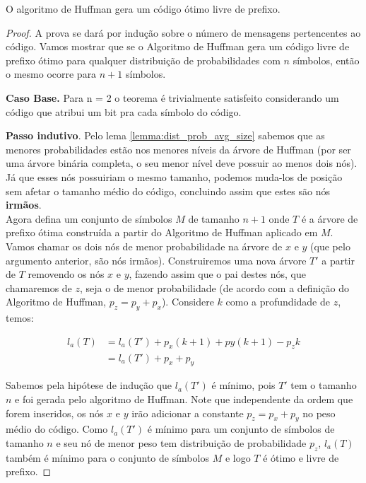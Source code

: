 \begin{theorem} O algoritmo de Huffman gera um código ótimo livre de prefixo.
\begin{proof}
A prova se dará por indução sobre o número de mensagens pertencentes ao código. 
Vamos mostrar que se o Algoritmo de Huffman gera um código livre de prefixo ótimo para qualquer distribuição de probabilidades com $n$ símbolos, então o mesmo ocorre para $n + 1$ símbolos.

\item \textbf{Caso Base.} Para n = 2 o teorema é trivialmente satisfeito considerando um código que atribui um bit pra cada símbolo do código.

\item \textbf{Passo indutivo}. Pelo lema \ref{lemma:dist_prob_avg_size} sabemos que as menores probabilidades estão nos menores níveis da árvore de Huffman (por ser uma árvore binária completa, o seu menor nível deve possuir ao menos dois nós). 
Já que esses nós possuiriam o mesmo tamanho, podemos muda-los de posição sem afetar o tamanho médio do código, concluindo assim que estes são nós \textbf{irmãos}.\\
Agora defina um conjunto de símbolos $M$ de tamanho $n + 1$ onde $T$ é a árvore de prefixo ótima construída a partir do Algoritmo de Huffman aplicado em $M$.
Vamos chamar os dois nós de menor probabilidade na árvore de $x$ e $y$ (que pelo argumento anterior, são nós irmãos). 
Construiremos uma nova árvore $T'$ a partir de $T$ removendo os nós $x$ e $y$, fazendo assim que o pai destes nós, que chamaremos de $z$, seja o de menor probabilidade (de acordo com a definição do Algoritmo de Huffman, $p_z = p_y + p_x$).
 Considere $k$ como a profundidade de $z$, temos:

\begin{align*}
l_a(T) &= l_a(T') + p_x(k + 1) + py(k + 1) - p_z k \\
&= l_a(T') + p_x + p_y
\end{align*}

Sabemos pela hipótese de indução que $l_a(T')$ é mínimo, pois $T'$ tem o tamanho $n$ e foi gerada pelo algoritmo de Huffman. 
Note que independente da ordem que forem inseridos, os nós $x$ e $y$ irão adicionar a constante $p_z = p_x + p_y$ no peso médio do código. 
Como $l_a(T')$ é mínimo para um conjunto de símbolos de tamanho $n$ e seu nó de menor peso tem distribuição de probabilidade $p_z$, $l_a(T)$ também é mínimo para o conjunto de símbolos $M$ e logo $T$ é ótimo e livre de prefixo. 
\end{proof}
\end{theorem}

